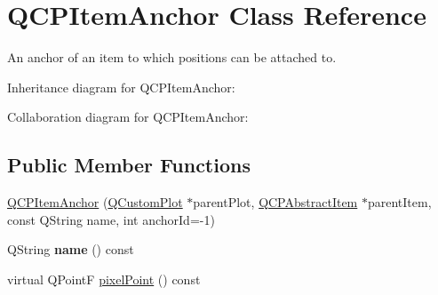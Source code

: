 \hypertarget{classQCPItemAnchor}{}\section{Q\+C\+P\+Item\+Anchor Class Reference}
\label{classQCPItemAnchor}


An anchor of an item to which positions can be attached to.  




Inheritance diagram for Q\+C\+P\+Item\+Anchor\+:


Collaboration diagram for Q\+C\+P\+Item\+Anchor\+:
\subsection*{Public Member Functions}
\begin{DoxyCompactItemize}
\item 
\hyperlink{classQCPItemAnchor_aeb6b681d2bf324db40a915d32ec5624f}{Q\+C\+P\+Item\+Anchor} (\hyperlink{classQCustomPlot}{Q\+Custom\+Plot} $\ast$parent\+Plot, \hyperlink{classQCPAbstractItem}{Q\+C\+P\+Abstract\+Item} $\ast$parent\+Item, const Q\+String name, int anchor\+Id=-\/1)
\item 
Q\+String {\bfseries name} () const \hypertarget{classQCPItemAnchor_ac93984042a58c875e76847dc3e5f75fe}{}\label{classQCPItemAnchor_ac93984042a58c875e76847dc3e5f75fe}

\item 
virtual Q\+PointF \hyperlink{classQCPItemAnchor_ae92def8f9297c5d73f5806c586517bb3}{pixel\+Point} () const 
\end{DoxyCompactItemize}
